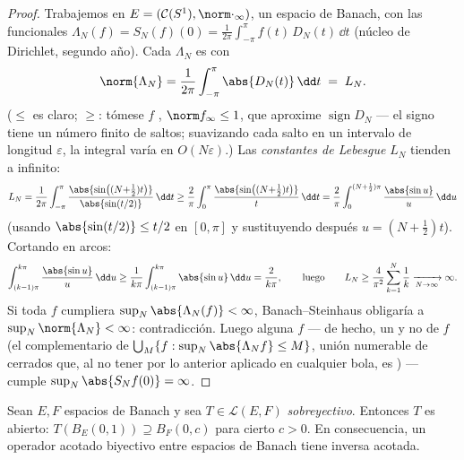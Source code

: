 \begin{proof}
Trabajemos en $E = (\mathcal C(S^1), \norm\cdot_\infty)$, un espacio de
Banach, con las funcionales $\Lambda_N(f) = S_N(f)(0) =
\frac1{2\pi}\int_{-\pi}^{\pi}f(t)\,D_N(t)\,\dd t$ (núcleo de Dirichlet,
segundo año). Cada $\Lambda_N$ es
 con
\[
\norm{\Lambda_N} = \frac1{2\pi}\int_{-\pi}^\pi\abs{D_N(t)}\,\dd
t \;=\; L_N .
\]
($\leq$ es claro; $\geq$: tómese $f$
, $\norm f_\infty
\leq 1$, que aproxime $\operatorname{sign}D_N$ --- el signo tiene un
número finito de saltos; suavizando cada salto en un intervalo de
longitud $\varepsilon$, la integral varía en $O(N\varepsilon)$.) Las
\emph{constantes de Lebesgue} $L_N$ tienden a infinito:
\[
L_N = \frac1{2\pi}\int_{-\pi}^{\pi}
\frac{\abs{\sin\bigl((N{+}\tfrac12)t\bigr)}}{\abs{\sin(t/2)}}
\,\dd t
\geq \frac{2}{\pi}\int_0^{\pi}
\frac{\abs{\sin\bigl((N{+}\tfrac12)t\bigr)}}{t}\,\dd t
= \frac{2}{\pi}\int_0^{(N+\frac12)\pi}\frac{\abs{\sin
u}}{u}\,\dd u
\]
(usando $\abs{\sin(t/2)} \leq t/2$ en $[0, \pi]$ y sustituyendo después
$u = (N + \tfrac12)t$). Cortando en arcos:
\[
\int_{(k-1)\pi}^{k\pi}\frac{\abs{\sin u}}u\,\dd u
\geq \frac1{k\pi}\int_{(k-1)\pi}^{k\pi}\abs{\sin u}\,\dd u =
\frac{2}{k\pi},
\qquad\text{luego}\qquad
L_N \geq \frac{4}{\pi^2}\sum_{k=1}^N\frac1k
\xrightarrow[N\to\infty]{} \infty .
\]
Si toda $f$  cumpliera
$\sup_N
\abs{\Lambda_N(f)} < \infty$, Banach--Steinhaus obligaría a
$\sup_N\norm{\Lambda_N} < \infty$: contradicción. Luego alguna $f$ ---
de hecho, un  y no
 de $f$ (el complementario de
$\bigcup_M\{f: \sup_N\abs{\Lambda_Nf}\leq M\}$, unión numerable de
cerrados que, al no tener 
por lo anterior aplicado en cualquier bola, es
) --- cumple
$\sup_N\abs{S_Nf(0)} =
\infty$.
\end{proof}

\begin{theorem}\label{thm:b3:banach:openmapping}
Sean $E, F$ espacios de Banach y sea $T \in \mathcal L(E, F)$
\emph{sobreyectivo}. Entonces $T$ es abierto: $T(B_E(0,1)) \supseteq
B_F(0, c)$ para cierto $c > 0$. En consecuencia, un operador acotado
biyectivo entre espacios de Banach tiene inversa acotada.
\end{theorem}

